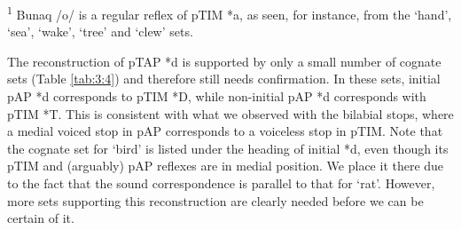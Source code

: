 \begin{table}
\textsuperscript{1} Bunaq /o/ is a regular reflex of pTIM *a, as seen, for instance, from the `hand', `sea', `wake', `tree' and `clew' sets. 
\end{table}


The reconstruction of pTAP *d is supported by only a small number of cognate sets (Table \ref{tab:3:4}) and therefore still needs confirmation. In these sets, initial pAP *d corresponds to pTIM *D, while non-initial pAP *d corresponds with pTIM *T. This is consistent with what we observed with the bilabial stops, where a medial voiced stop in pAP corresponds to a voiceless stop in pTIM. Note that the cognate set for `bird' is listed under the heading of initial *d, even though its pTIM and (arguably) pAP reflexes are in medial position. We place it there due to the fact that the sound correspondence is parallel to that for `rat'. However, more sets supporting this reconstruction are clearly needed before we can be certain of it. 
 
